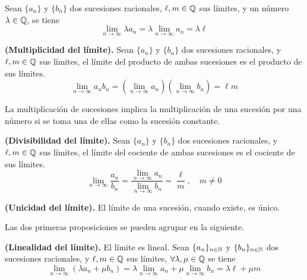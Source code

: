 \begin{prop}
    Sean $\{a_n\}$ y $\{b_n\} $ dos sucesiones racionales, $\ell, m\in\mathbb{Q}$ sus límites, y un número $\lambda\in\mathbb{Q}$, se tiene
    \begin{equation}
        \lim_{n\to\infty}\lambda  a_n = \lambda \lim_{n\to\infty}a_n = \lambda\ell
    \end{equation}
\end{prop}

\begin{prop}
    \textbf{(Multiplicidad del límite).} Sean $\{a_n\} $ y $\{b_n\} $ dos sucesiones racionales, y $\ell, m\in\mathbb{Q}$ sus límites, el límite del producto de ambas sucesiones es el producto de sus límites.
    \begin{equation}
    \lim_{n\to\infty}a_nb_n = \left( \lim_{n\to\infty} a_n\right) \left( \lim_{n\to\infty}b_n \right) = \ell m
    \end{equation}
\end{prop}

\begin{remark}
    La multiplicación de sucesiones implica la multiplicación de una sucesión por una número si se toma una de ellas como la sucesión constante.
\end{remark}

\begin{prop}
    \textbf{(Divisibilidad del límite).} Sean $\{a_n\} $ y $\{b_n\} $ dos sucesiones racionales, y $\ell, m\in\mathbb{Q}$ sus límites, el límite del cociente de ambas sucesiones es el cociente de sus límites.
    \begin{equation}
        \lim_{n\to\infty} \frac{a_n}{b_n} = \frac{\lim_{n\to\infty} a_n}{\lim_{n\to\infty}b_n} = \frac{\ell}{m},\quad m\neq 0
    \end{equation}
\end{prop}

\begin{prop}
    \textbf{(Unicidad del límite).} El límite de una sucesión, cuando existe, es único.
\end{prop}

Las dos primeras proposiciones se pueden agrupar en la siguiente.

\begin{prop}
    \textbf{(Linealidad del límite).} El límite es lineal. Sean $\{a_n\}_{n\in\mathbb{N}} $ y $\{b_n\}_{n\in\mathbb{N}} $ dos sucesiones racionales, y $\ell, m\in\mathbb{Q}$ sus límites, $\forall\lambda, \mu\in\mathbb{Q}$ se tiene
    \begin{equation}
        \lim_{n\to\infty}\left( \lambda a_n + \mu b_n \right) = \lambda \lim_{n\to\infty}a_n + \mu\lim_{n\to\infty}b_n = \lambda\ell + \mu m
    \end{equation}
\end{prop}

